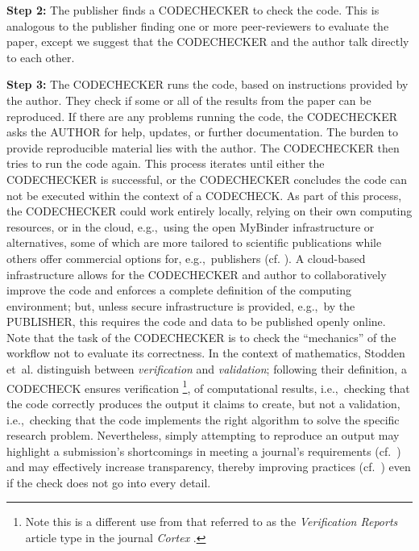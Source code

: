 \documentclass[12pt]{article}
\begin{document}
\textbf{Step 2:} The publisher finds a CODECHECKER to check the
code. This is analogous to the publisher finding one or more
peer-reviewers to evaluate the paper, except we suggest that the
CODECHECKER and the author talk directly to each other.

\textbf{Step 3:} The CODECHECKER runs the code, based on instructions provided by
the author. They check if some or all of the results from the paper can be
reproduced. If there are
any problems running the code, the CODECHECKER asks the AUTHOR for help,
updates, or further documentation.
The burden to provide reproducible material lies with the author.
The CODECHECKER then tries to run the code again.
This process iterates until either the CODECHECKER is successful,
or the CODECHECKER concludes the code can not be executed within the context of a CODECHECK.
As part of this process, the CODECHECKER could work entirely locally, relying on their own computing resources, or in the cloud, e.g.,~using the open MyBinder infrastructure \cite{jupyter_binder_2018} or alternatives, some of which are more tailored to scientific publications while others offer commercial options for, e.g.,~publishers (cf. \cite{konkol_publishing_2020}).
A cloud-based infrastructure allows for the CODECHECKER and author to collaboratively improve the code and enforces a complete definition of the computing environment; but, unless secure infrastructure is provided, e.g.,~by the PUBLISHER, this requires the code and data to be published openly online.
Note that the task of the CODECHECKER is to check the ``mechanics'' of the workflow not to evaluate its correctness. 
In the context of mathematics, Stodden et~al. \cite{stodden_setting_2013} distinguish between \emph{verification} and \emph{validation};
following their definition, a CODECHECK ensures verification
\footnote{Note this is a different use from that referred to as the \emph{Verification Reports} article type in the journal \emph{Cortex} \cite{chambers_verification_2020}.},
of computational results, i.e.,~checking that the code correctly produces the output it claims to create, but not a validation, i.e.,~checking that the code implements the right algorithm to solve the specific research problem.
Nevertheless, simply attempting to reproduce an output may highlight a submission's shortcomings in meeting a journal's requirements (cf.~\cite{christian_journal_2020}) and may effectively increase transparency, thereby improving practices (cf.~\cite{nosek_scientific_2012}) even if the check does not go into every detail.
\end{document}
